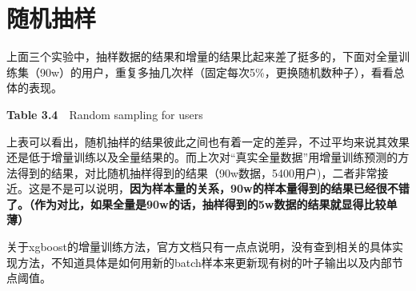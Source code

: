 \documentclass{article}
\begin{document}
\section{随机抽样}
上面三个实验中，抽样数据的结果和增量的结果比起来差了挺多的，下面对全量训练集（90w）的用户，重复多抽几次样（固定每次5\%，更换随机数种子），看看总体的表现。
\begin{table}[htbp]
  \centering
  \textbf{Table 3.4}~~Random sampling for users
  \label{tab:addlabel}%
\end{table}%

\newpage
上表可以看出，随机抽样的结果彼此之间也有着一定的差异，不过平均来说其效果还是低于增量训练以及全量结果的。而上次对“真实全量数据”用增量训练预测的方法得到的结果，对比随机抽样得到的结果（90w数据，5400用户)，二者非常接近。这是不是可以说明，\textbf{因为样本量的关系，90w的样本量得到的结果已经很不错了。（作为对比，如果全量是90w的话，抽样得到的5w数据的结果就显得比较单薄）}


关于xgboost的增量训练方法，官方文档只有一点点说明，没有查到相关的具体实现方法，不知道具体是如何用新的batch样本来更新现有树的叶子输出以及内部节点阈值。
\end{document}
